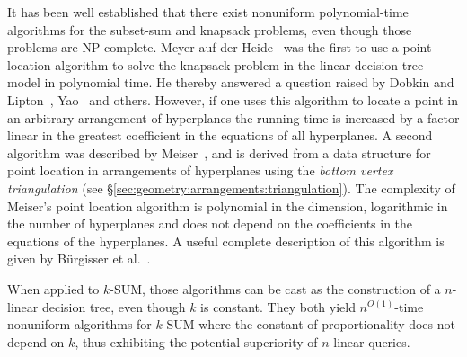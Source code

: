 It has been well established that there exist nonuniform
polynomial-time algorithms for the subset-sum and knapsack problems, even
though those problems are \textsc{NP}-complete.
%
Meyer auf der Heide~\cite{M84} was the first to use a point location algorithm to solve
the knapsack problem in the linear decision tree model in polynomial time. He
thereby answered a question raised by Dobkin and Lipton~\cite{DL74,DL78},
Yao~\cite{Y82} and others. However, if one uses this algorithm to locate a
point in an arbitrary arrangement of hyperplanes the running time is increased
by a factor linear in the greatest coefficient in the equations of all
hyperplanes.
%
A second algorithm was described by Meiser~\cite{M93}, and is derived from a
data structure for point location in arrangements of hyperplanes using the
\emph{bottom vertex triangulation} (see
\S\ref{sec:geometry:arrangements:triangulation}).
%
The complexity of Meiser's point location algorithm is polynomial in the
dimension, logarithmic in the number of hyperplanes and does not depend on the
coefficients in the equations of the hyperplanes. A useful
complete description of this algorithm is given by Bürgisser et
al.~\cite[Section~3.4]{BCS97}.

When applied to \(k\)-SUM, those algorithms can be cast as the construction of
a \(n\)-linear decision tree, even though \(k\) is constant.
They both yield \(n^{O(1)}\)-time nonuniform algorithms for
\(k\)-SUM where the constant of proportionality does not depend on \(k\), thus
exhibiting the potential superiority of $n$-linear queries.
